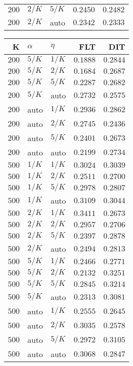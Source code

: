 \begin{table}
\begin{spacing}{1.2}
{\begin{tabular}{rll|rr}
$200$ &  $2/K$ &  $5/K$ &         $0.2450$ & $0.2482$ \\
$200$ &  $2/K$ &   auto &         $0.2342$ & $0.2333$ \\
\bottomrule
\end{tabular}
} \hfill \parbox{.45\linewidth}{\centering \begin{tabular}{rll|rr}
\toprule
    K &  $\alpha$ &    $\eta$ & FLT &        DIT \\
\midrule
$200$ &  $5/K$ &  $1/K$ &         $0.1888$ &      $0.2844$ \\
$200$ &  $5/K$ &  $2/K$ &         $0.1684$ &      $0.2687$ \\
$200$ &  $5/K$ &  $5/K$ &         $0.2287$ &      $0.2682$ \\
$200$ &  $5/K$ &   auto &         $0.2732$ &      $0.2575$ \\
$200$ &   auto &  $1/K$ &         $0.2936$ &      $0.2862$ \\
$200$ &   auto &  $2/K$ &         $0.2745$ &      $0.2436$ \\
$200$ &   auto &  $5/K$ &         $0.2401$ &      $0.2673$ \\
$200$ &   auto &   auto &         $0.2199$ &      $0.2734$ \\
$500$ &  $1/K$ &  $1/K$ &         $0.3024$ &      $0.3039$ \\
$500$ &  $1/K$ &  $2/K$ &         $0.2511$ &      $0.2700$ \\
$500$ &  $1/K$ &  $5/K$ &         $0.2978$ &      $0.2807$ \\
$500$ &  $1/K$ &   auto &         $0.3109$ &      $0.3044$ \\
$500$ &  $2/K$ &  $1/K$ &    $\bm{0.3411}$ &      $0.2673$ \\
$500$ &  $2/K$ &  $2/K$ &         $0.2957$ &      $0.2706$ \\
$500$ &  $2/K$ &  $5/K$ &         $0.2397$ &      $0.2878$ \\
$500$ &  $2/K$ &   auto &         $0.2494$ &      $0.2813$ \\
$500$ &  $5/K$ &  $1/K$ &         $0.2466$ &      $0.2771$ \\
$500$ &  $5/K$ &  $2/K$ &         $0.2132$ & $\bm{0.3251}$ \\
$500$ &  $5/K$ &  $5/K$ &         $0.2845$ &      $0.3214$ \\
$500$ &  $5/K$ &   auto &         $0.2313$ &      $0.3081$ \\
$500$ &   auto &  $1/K$ &         $0.2555$ &      $0.2645$ \\
$500$ &   auto &  $2/K$ &         $0.3035$ &      $0.2578$ \\
$500$ &   auto &  $5/K$ &         $0.2972$ &      $0.3105$ \\
$500$ &   auto &   auto &         $0.3068$ &      $0.2847$ \\
\bottomrule
\end{tabular}
}
\end{spacing}
\end{table}
